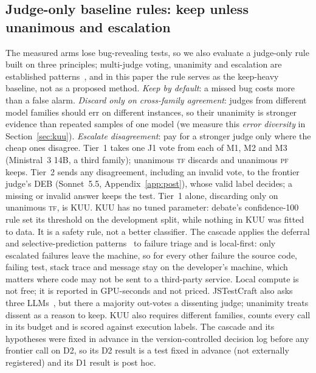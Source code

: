 \documentclass[pdflatex,iicol,sn-mathphys-num]{sn-jnl}
\newcommand{\PF}{\textsc{pf}}
\newcommand{\TF}{\textsc{tf}}
\begin{document}
\subsection{Judge-only baseline rules: keep unless unanimous and escalation}\label{sec:cascade}
The measured arms lose bug-revealing tests, so we also evaluate a judge-only rule built on three principles; multi-judge voting, unanimity and escalation are established patterns~\cite{wang2025json,becker2026jit,zhang2026testagent}, and in this paper the rule serves as the keep-heavy baseline, not as a proposed method. \emph{Keep by default}: a missed bug costs more than a false alarm. \emph{Discard only on cross-family agreement}: judges from different model families should err on different instances, so their unanimity is stronger evidence than repeated samples of one model (we measure this \emph{error diversity} in Section~\ref{sec:kuu}). \emph{Escalate disagreement}: pay for a stronger judge only where the cheap ones disagree. Tier~1 takes one J1 vote from each of M1, M2 and M3 (Ministral~3 14B, a third family); unanimous \TF{} discards and unanimous \PF{} keeps. Tier~2 sends any disagreement, including an invalid vote, to the frontier judge's DEB (Sonnet~5.5, Appendix~\ref{app:post}), whose valid label decides; a missing or invalid answer keeps the test. Tier~1 alone, discarding only on unanimous \TF{}, is KUU. KUU has no tuned parameter: debate's confidence-100 rule set its threshold on the development split, while nothing in KUU was fitted to data. It is a safety rule, not a better classifier. The cascade applies the deferral and selective-prediction patterns~\cite{chen2023frugalgpt,geifman2017selective} to failure triage and is local-first: only escalated failures leave the machine, so for every other failure the source code, failing test, stack trace and message stay on the developer's machine, which matters where code may not be sent to a third-party service. Local compute is not free; it is reported in GPU-seconds and not priced. JSTestCraft also asks three LLMs~\cite{liu2026jstestcraft}, but there a majority out-votes a dissenting judge; unanimity treats dissent as a reason to keep. KUU also requires different families, counts every call in its budget and is scored against execution labels. The cascade and its hypotheses were fixed in advance in the version-controlled decision log before any frontier call on D2, so its D2 result is a test fixed in advance (not externally registered) and its D1 result is post hoc.

\end{document}
